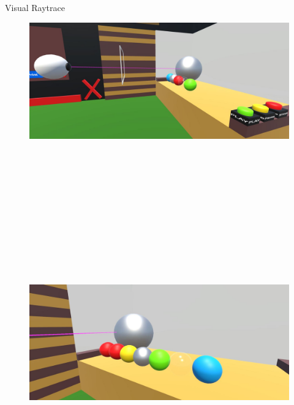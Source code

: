 \documentclass[final,hyperref={pdfpagelabels=false}]{beamer}
\begin{document}
\begin{frame}[t]
\begin{columns}[t]
\begin{column}{.96\textwidth}
\begin{block}{Visual Raytrace}
	\begin{figure}
		\centering
        \includegraphics[width=0.49\linewidth]{vorgang}
        \includegraphics[height=17.35cm]{duringProcessHitObjects}            	   
    \end{figure}

 

\end{block}
\end{column}
\end{columns}
\end{frame}
\end{document}

